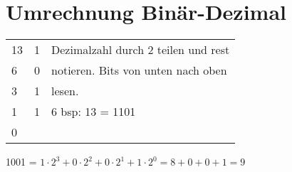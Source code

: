 \section{Umrechnung Binär-Dezimal}


\begin{center}
	\begin{tabular}{ lll } 
	13	&	1	& Dezimalzahl durch 2 teilen und rest\\
	6	& 	0	& notieren. Bits von unten nach oben\\
	3	&	1	& lesen.\\
	1	&	1	&6 bsp: 13 = 1101\\
	0 & & \\
		
	\end{tabular}
\end{center}
1001 = $1\cdot2^3 + 0 \cdot 2^2 + 0 \cdot 2^1 + 1 \cdot 2^0 = 8+0+0+1=9$























